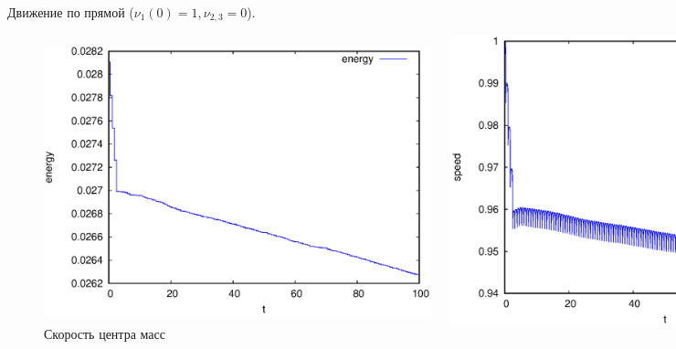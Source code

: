 \documentclass{beamer}
\begin{document}
\begin{frame}{Движение по прямой ($\nu_1(0) = 1, \nu_{2,3} = 0$).}
    \begin{figure}[H]
        \centering
        \begin{columns}
                \centering
                \includegraphics[width=\linewidth]{pic/straight_100/kin_en.eps}
                \vspace{-15pt}
                \caption{Кинетическая энергия}
                \centering
                \includegraphics[width=\linewidth]{pic/straight_100/v.eps}
                \vspace{-15pt}
                \caption{Скорость центра масс}

\end{columns}
\end{figure}
\end{frame}
\end{document}
